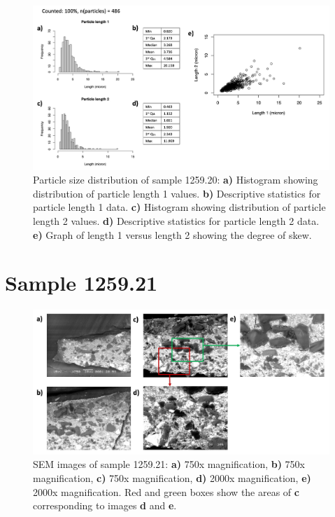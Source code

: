 \begin{figure}[H]
\centering
  \includegraphics[width=0.8\linewidth]{1259.20_partsize}
\caption[Particle size distribution, sample 1259.20.]{Particle size distribution of sample 1259.20: \textbf{a)} Histogram showing distribution of particle length 1 values. \textbf{b)} Descriptive statistics for particle length 1 data. \textbf{c)} Histogram showing distribution of particle length 2 values. \textbf{d)} Descriptive statistics for particle length 2 data. \textbf{e)} Graph of length 1 versus length 2 showing the degree of skew.}
\label{fig:1259.20_partsize}
\end{figure}



\section{Sample 1259.21}


\begin{figure}[H]
  \centering
  \includegraphics[width=0.8\linewidth]{1259.21_imgs}
\caption[SEM images of sample 1259.21.]{SEM images of sample 1259.21: \textbf{a)} 750x magnification, \textbf{b)} 750x magnification, \textbf{c)} 750x magnification, \textbf{d)} 2000x magnification, \textbf{e)} 2000x magnification. Red and green boxes show the areas of \textbf{c} corresponding to images \textbf{d} and \textbf{e}.}
\label{fig:1259.21_imgs}
\end{figure}

